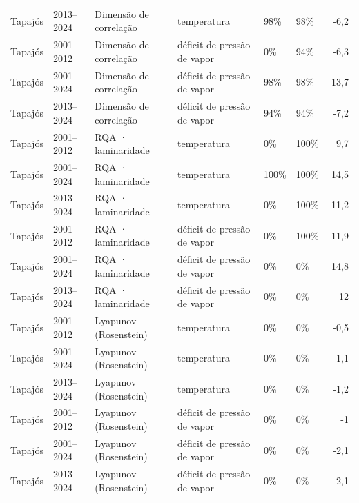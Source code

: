 \begin{table}
\begin{tabular}{llllllr}
Tapajós & 2013–2024 & Dimensão de correlação & temperatura & 98\% & 98\% & -6,2 \\
Tapajós & 2001–2012 & Dimensão de correlação & déficit de pressão de vapor & 0\% & 94\% & -6,3 \\
Tapajós & 2001–2024 & Dimensão de correlação & déficit de pressão de vapor & 98\% & 98\% & -13,7 \\
Tapajós & 2013–2024 & Dimensão de correlação & déficit de pressão de vapor & 94\% & 94\% & -7,2 \\
Tapajós & 2001–2012 & RQA · laminaridade & temperatura & 0\% & 100\% & 9,7 \\
Tapajós & 2001–2024 & RQA · laminaridade & temperatura & 100\% & 100\% & 14,5 \\
Tapajós & 2013–2024 & RQA · laminaridade & temperatura & 0\% & 100\% & 11,2 \\
Tapajós & 2001–2012 & RQA · laminaridade & déficit de pressão de vapor & 0\% & 100\% & 11,9 \\
Tapajós & 2001–2024 & RQA · laminaridade & déficit de pressão de vapor & 0\% & 0\% & 14,8 \\
Tapajós & 2013–2024 & RQA · laminaridade & déficit de pressão de vapor & 0\% & 0\% & 12 \\
Tapajós & 2001–2012 & Lyapunov (Rosenstein) & temperatura & 0\% & 0\% & -0,5 \\
Tapajós & 2001–2024 & Lyapunov (Rosenstein) & temperatura & 0\% & 0\% & -1,1 \\
Tapajós & 2013–2024 & Lyapunov (Rosenstein) & temperatura & 0\% & 0\% & -1,2 \\
Tapajós & 2001–2012 & Lyapunov (Rosenstein) & déficit de pressão de vapor & 0\% & 0\% & -1 \\
Tapajós & 2001–2024 & Lyapunov (Rosenstein) & déficit de pressão de vapor & 0\% & 0\% & -2,1 \\
Tapajós & 2013–2024 & Lyapunov (Rosenstein) & déficit de pressão de vapor & 0\% & 0\% & -2,1 \\
\bottomrule
\end{tabular}
\end{table}
